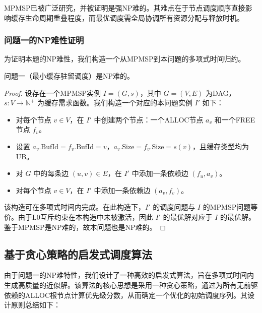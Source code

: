 MPMSP已被广泛研究，并被证明是强NP难的\cite{Liu2017Memory}。其难点在于节点调度顺序直接影响缓存生命周期重叠程度，而最优调度需全局协调所有资源分配与释放时机。

\subsubsection{问题一的NP难性证明}
\label{subsubsec:reduction}

为证明本题的NP难性，我们构造一个从MPMSP到本问题的多项式时间归约。

\begin{theorem}
问题一（最小缓存驻留调度）是NP难的。
\end{theorem}

\begin{proof}
设存在一个MPMSP实例 $ I = (G, s) $，其中 $ G = (V, E) $ 为DAG，$ s: V \to \mathbb{N}^+ $ 为缓存需求函数。我们构造一个对应的本问题实例 $ I' $ 如下：

\begin{itemize}
    \item 对每个节点 $ v \in V $，在 $ I' $ 中创建两个节点：一个ALLOC节点 $ a_v $ 和一个FREE节点 $ f_v $。
    \item 设置 $ a_v.\text{BufId} = f_v.\text{BufId} = v $，$ a_v.\text{Size} = f_v.\text{Size} = s(v) $，且缓存类型均为UB。
    \item 对 $ G $ 中的每条边 $ (u, v) \in E $，在 $ I' $ 中添加一条依赖边 $ (f_u, a_v) $。
    \item 对每个节点 $ v \in V $，在 $ I' $ 中添加一条依赖边 $ (a_v, f_v) $。
\end{itemize}
该构造可在多项式时间内完成。在此构造下，$ I' $ 的调度问题与 $ I $ 的MPMSP问题等价。由于L0互斥约束在本构造中未被激活，因此 $ I' $ 的最优解对应于 $ I $ 的最优解。鉴于MPMSP是NP难的，故本问题也是NP难的。
\end{proof}

\subsection{基于贪心策略的启发式调度算法}
\label{subsec:heuristic_algorithm}

由于问题一的NP难特性，我们设计了一种高效的启发式算法，旨在多项式时间内生成高质量的近似解。该算法的核心思想是采用一种贪心策略，通过为所有无前驱依赖的ALLOC根节点计算优先级分数，从而确定一个优化的初始调度序列。其设计原则总结如下：

